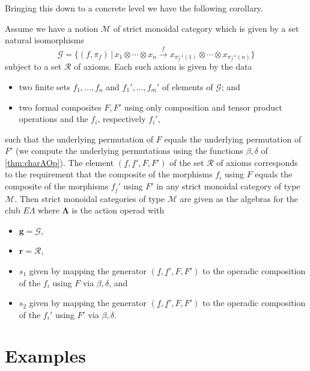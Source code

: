 \documentclass{amsbook} %
\newcommand{\mb}{\mathbf}
\numberwithin{section}{chapter}
\begin{document}
Bringing this down to a concrete level we have the following corollary.

\begin{cor}\label{pres2}
Assume we have a notion $\mathcal{M}$ of strict monoidal category which is given by  a set natural isomorphisms
\[
\mathcal{G} = \{ (f, \pi_{f}) \, | \,  x_{1} \otimes \cdots \otimes x_{n} \stackrel{f}{\longrightarrow} x_{\pi_{f}^{-1}(1)} \otimes \cdots \otimes x_{\pi_{f}^{-1}(n)} \}
\]
subject to a set $\mathcal{R}$ of axioms.  Each such axiom is given by the data
\begin{itemize}
\item two finite sets $f_{1}, \ldots, f_{n}$ and $f_{1}', \ldots, f_{m}'$ of elements of $\mathcal{G}$; and
\item two formal composites $F,F'$ using only composition and tensor product operations and the $f_{i}$, respectively $f_{i}'$, 
\end{itemize}
such that the underlying permutation of $F$ equals the underlying permutation of $F'$ (we compute the underlying permutations using the functions $\beta, \delta$ of \cref{thm:charAOp}).  The element $(\underline{f}, \underline{f}', F, F')$ of the set $\mathcal{R}$ of axioms corresponds to the requirement that the composite of the morphisms $f_{i}$ using $F$ equals the composite of the morphisms $f_{j}'$ using $F'$ in any strict monoidal category of type $\mathcal{M}$.  Then strict monoidal categories of type $\mathcal{M}$ are given as the algebras for the club $E\Lambda$ where $\mb{\Lambda}$ is the action operad with
\begin{itemize}
\item $\mathbf{g} = \mathcal{G}$,
\item $\mathbf{r} = \mathcal{R}$,
\item $s_{1}$ given by mapping the generator $(\underline{f}, \underline{f}', F, F')$ to the operadic composition of the $f_{i}$ using $F$ via $\beta, \delta$, and
\item $s_{2}$ given by mapping the generator $(\underline{f}, \underline{f}', F, F')$ to the operadic composition of the $f_{i}'$ using $F'$ via $\beta, \delta$.
\end{itemize}
\end{cor}

\section{Examples}\label{sec:examples}
\end{document}
